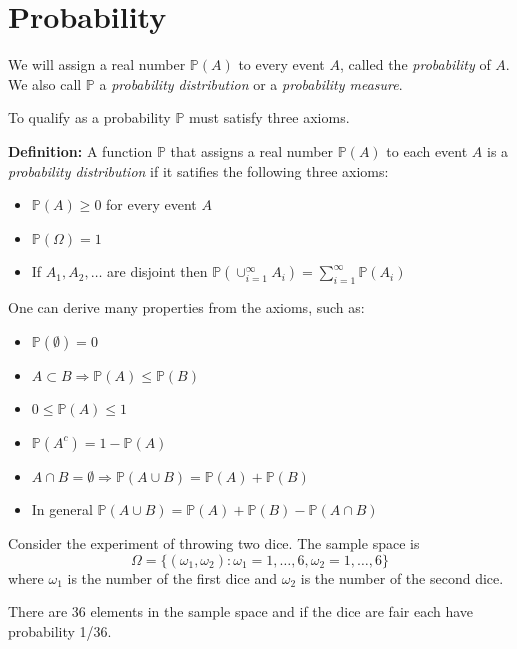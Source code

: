 \documentclass[
]{book}
\providecommand{\tightlist}{%
  \setlength{\itemsep}{0pt}\setlength{\parskip}{0pt}}
\theoremstyle{definition}
\theoremstyle{definition}
\theoremstyle{definition}
\theoremstyle{definition}
\theoremstyle{remark}
\begin{document}
\hypertarget{probability}{%
\section{Probability}\label{probability}}

We will assign a real number \(\mathbb{P}(A)\) to every event \(A\), called the \emph{probability} of \(A\). We also call \(\mathbb{P}\) a \emph{probability distribution} or a \emph{probability measure}.

To qualify as a probability \(\mathbb{P}\) must satisfy three axioms.

\textbf{Definition:} A function \(\mathbb{P}\) that assigns a real number \(\mathbb{P}(A)\) to each event \(A\) is a \emph{probability distribution} if it satifies the following three axioms:

\begin{itemize}
\tightlist
\item
  \(\mathbb{P}(A)\geq 0\) for every event \(A\)
\item
  \(\mathbb{P}(\Omega)=1\)
\item
  If \(A_1,A_2,\dots\) are disjoint then \(\mathbb{P}(\cup_{i=1}^\infty A_i)=\sum_{i=1}^\infty\mathbb{P}(A_i)\)
\end{itemize}

One can derive many properties from the axioms, such as:

\begin{itemize}
\tightlist
\item
  \(\mathbb{P}(\emptyset)=0\)
\item
  \(A\subset B \Rightarrow \mathbb{P}(A) \leq \mathbb{P}(B)\)
\item
  \(0\leq \mathbb{P}(A) \leq 1\)
\item
  \(\mathbb{P}(A^c)= 1-\mathbb{P}(A)\)
\item
  \(A\cap B = \emptyset \Rightarrow \mathbb{P}(A\cup B) = \mathbb{P}(A)+\mathbb{P}(B)\)
\item
  In general \(\mathbb{P}(A\cup B) = \mathbb{P}(A)+\mathbb{P}(B)- \mathbb{P}(A\cap B)\)
\end{itemize}

Consider the experiment of throwing two dice. The sample space is
\[
\Omega = \{(\omega_1,\omega_2): \omega_1=1,\dots,6, \omega_2=1,\dots,6\}
\]
where \(\omega_1\) is the number of the first dice and \(\omega_2\) is the number of the second dice.

There are 36 elements in the sample space and if the dice are fair each have probability 1/36.
\end{document}
